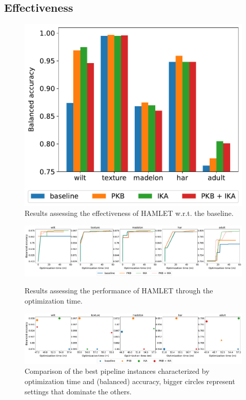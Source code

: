 \subsection{Effectiveness}
\begin{figure}[t]
    \centering
    \includegraphics[scale=.45]{chapters/human-centric/hamlet/img/accuracy.pdf}
    \caption{Results assessing the effectiveness of HAMLET w.r.t. the baseline.}
    \label{fig:effectiveness}
\end{figure}

\begin{figure}[h!]
    \RawFloats
    \centering
    \includegraphics[scale=.25]{chapters/human-centric/hamlet/img/accuracy_time.pdf}
    \caption{Results assessing the performance of HAMLET through the optimization time.}
    \label{fig:efficiency}
    \includegraphics[scale=.25]{chapters/human-centric/hamlet/img/skyline.pdf}
    \caption{Comparison of the best pipeline instances characterized by optimization time and (balanced) accuracy, bigger circles represent settings that dominate the others.}
    \label{fig:effskyline}
\end{figure}

